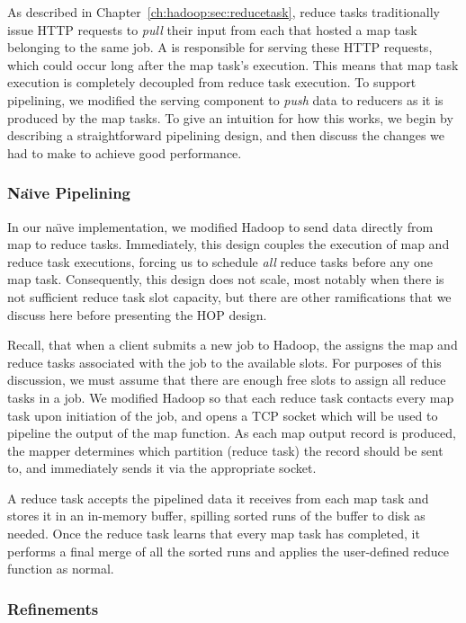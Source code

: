 As described in Chapter~\ref{ch:hadoop:sec:reducetask}, reduce tasks
traditionally issue HTTP requests to {\em pull} their input from each {\TT}
that hosted a map task belonging to the same job.  A \TT is responsible for
serving these HTTP requests, which could occur long after the map task's
execution.  This means that map task execution is completely decoupled from
reduce task execution.  To support pipelining, we modified the \TT serving
component to {\em push} data to reducers as it is produced by the map tasks.
To give an intuition for how this works, we begin by describing a
straightforward pipelining design, and then discuss the changes we had to make
to achieve good performance.

\subsubsection{Na\"{\i}ve Pipelining}
\label{ch:hop:sec:naive}

In our na\"{\i}ve implementation, we modified Hadoop to send data directly from
map to reduce tasks.  Immediately, this design couples the execution of map and
reduce task executions, forcing us to schedule {\em all} reduce tasks before
any one map task.  Consequently, this design does not scale, most notably when
there is not sufficient reduce task slot capacity, but there are other
ramifications that we discuss here before presenting the HOP design.

Recall, that when a client submits a new job to Hadoop, the {\JT} assigns the
map and reduce tasks associated with the job to the available {\TT} slots.  For
purposes of this discussion, we must assume that there are enough free slots to
assign all reduce tasks in a job.  We modified Hadoop so that each reduce task
contacts every map task upon initiation of the job, and opens a TCP socket
which will be used to pipeline the output of the map function.  As each map
output record is produced, the mapper determines which partition (reduce task)
the record should be sent to, and immediately sends it via the appropriate
socket.

A reduce task accepts the pipelined data it receives from each map task and
stores it in an in-memory buffer, spilling sorted runs of the buffer to disk as
needed. Once the reduce task learns that every map task has completed, it
performs a final merge of all the sorted runs and applies the user-defined
reduce function as normal.

\subsubsection{Refinements}
\label{ch:hop:sec:pipe-refine}

